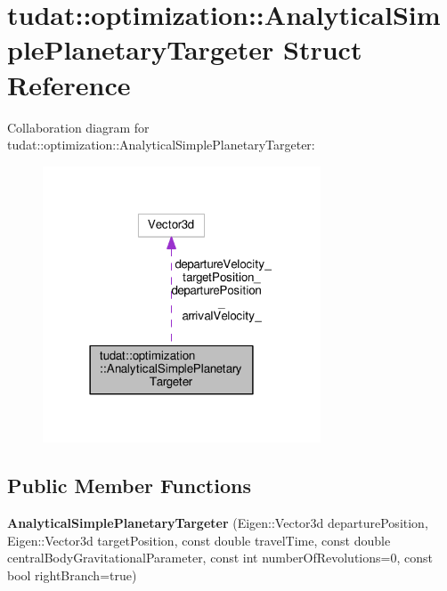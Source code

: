 \hypertarget{structtudat_1_1optimization_1_1AnalyticalSimplePlanetaryTargeter}{}\section{tudat\+:\+:optimization\+:\+:Analytical\+Simple\+Planetary\+Targeter Struct Reference}
\label{structtudat_1_1optimization_1_1AnalyticalSimplePlanetaryTargeter}


Collaboration diagram for tudat\+:\+:optimization\+:\+:Analytical\+Simple\+Planetary\+Targeter\+:
\nopagebreak
\begin{figure}[H]
\begin{center}
\leavevmode
\includegraphics[width=234pt]{structtudat_1_1optimization_1_1AnalyticalSimplePlanetaryTargeter__coll__graph}
\end{center}
\end{figure}
\subsection*{Public Member Functions}
\begin{DoxyCompactItemize}
\item 
{\bfseries Analytical\+Simple\+Planetary\+Targeter} (Eigen\+::\+Vector3d departure\+Position, Eigen\+::\+Vector3d target\+Position, const double travel\+Time, const double central\+Body\+Gravitational\+Parameter, const int number\+Of\+Revolutions=0, const bool right\+Branch=true)\hypertarget{structtudat_1_1optimization_1_1AnalyticalSimplePlanetaryTargeter_a31ac39324cc9ea06117926c74af69c79}{}\label{structtudat_1_1optimization_1_1AnalyticalSimplePlanetaryTargeter_a31ac39324cc9ea06117926c74af69c79}

\end{DoxyCompactItemize}
